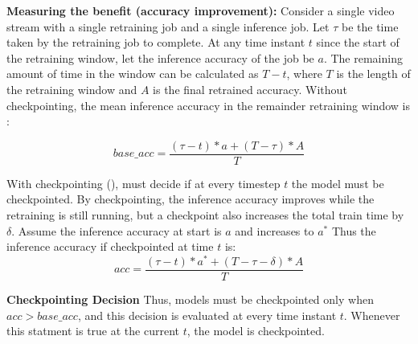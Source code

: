 \textbf{Measuring the benefit (accuracy improvement): } Consider a single video stream with a single retraining job and a single inference job. Let $\tau$ be the time taken by the retraining job to complete. At any time instant $t$ since the start of the retraining window, let the inference accuracy of the job be $a$. The remaining amount of time in the window can be calculated as $T-t$, where $T$ is the length of the retraining window and $A$ is the final retrained accuracy. Without checkpointing, the mean inference accuracy in the remainder retraining window is :

\[
    base\_acc = \frac{(\tau-t)*a + (T-\tau)*A}{T} 
\]

With checkpointing (), \name{} must decide if at every timestep $t$ the model must be checkpointed. By checkpointing, the inference accuracy improves while the retraining is still running, but a checkpoint also increases the total train time by $\delta$. Assume the inference accuracy at start is $a$ and increases to $a^{*}$ Thus the inference accuracy if checkpointed at time $t$ is:  
\[
    acc = \frac{(\tau-t)*a^{*} + (T-\tau-\delta)*A}{T} 
\]

\textbf{Checkpointing Decision} Thus, models must be checkpointed only when $acc > base\_acc$, and this decision is evaluated at every time instant $t$. Whenever this statment is true at the current $t$, the model is checkpointed.


